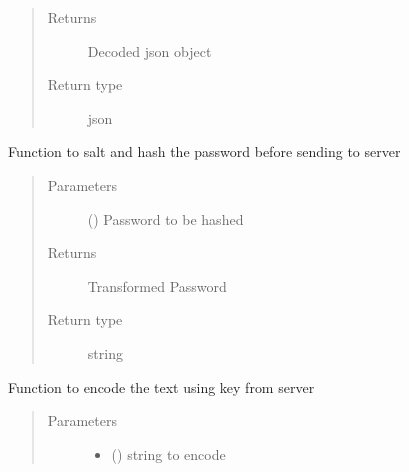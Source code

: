 \documentclass[letterpaper,10pt,english]{sphinxmanual}
\begin{document}
\begin{fulllineitems}
\begin{fulllineitems}
\begin{quote}
\begin{description}
\begin{itemize}
\end{itemize}

\item[{Returns}] \leavevmode
Decoded json object

\item[{Return type}] \leavevmode
json

\end{description}\end{quote}

\end{fulllineitems}


\begin{fulllineitems}
\label{\detokenize{Message:Message.Message._hash_password}}
Function to salt and hash the password before sending to server
\begin{quote}\begin{description}
\item[{Parameters}] \leavevmode
{} () \textendash{} Password to be hashed

\item[{Returns}] \leavevmode
Transformed Password

\item[{Return type}] \leavevmode
string

\end{description}\end{quote}

\end{fulllineitems}


\begin{fulllineitems}
\label{\detokenize{Message:Message.Message._encode}}
Function to encode the text using key from server
\begin{quote}\begin{description}
\item[{Parameters}] \leavevmode\begin{itemize}
\item {} 
 () \textendash{} string to encode


\end{itemize}
\end{description}
\end{quote}
\end{fulllineitems}
\end{fulllineitems}
\end{document}

